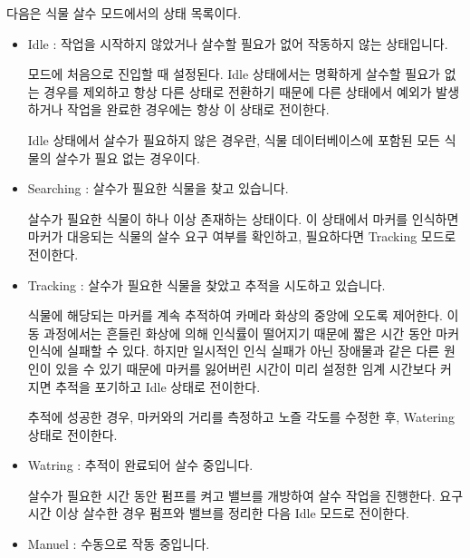 \documentclass[chapter,11pt,oneside,openany]{xoblivoir}
\begin{document}
다음은 식물 살수 모드에서의 상태 목록이다.
\begin{itemize}
\item Idle : 작업을 시작하지 않았거나 살수할 필요가 없어 작동하지 않는 상태입니다.

모드에 처음으로 진입할 때 설정된다. Idle 상태에서는 명확하게 살수할 필요가 없는 경우를 제외하고 항상
다른 상태로 전환하기 때문에 다른 상태에서 예외가 발생하거나 작업을 완료한 경우에는 항상 이 상태로 전이한다.

Idle 상태에서 살수가 필요하지 않은 경우란, 식물 데이터베이스에 포함된 모든 식물의 살수가 필요 없는 경우이다.

\item Searching : 살수가 필요한 식물을 찾고 있습니다.

살수가 필요한 식물이 하나 이상 존재하는 상태이다. 이 상태에서 마커를 인식하면 마커가 대응되는 식물의
살수 요구 여부를 확인하고, 필요하다면 Tracking 모드로 전이한다.

\item Tracking : 살수가 필요한 식물을 찾았고 추적을 시도하고 있습니다.

식물에 해당되는 마커를 계속 추적하여 카메라 화상의 중앙에 오도록 제어한다.
이동 과정에서는 흔들린 화상에 의해 인식률이 떨어지기 때문에 짧은 시간 동안 마커 인식에 실패할 수 있다.
하지만 일시적인 인식 실패가 아닌 장애물과 같은 다른 원인이 있을 수 있기 때문에
마커를 잃어버린 시간이 미리 설정한 임계 시간보다 커지면 추적을 포기하고 Idle 상태로 전이한다.

추적에 성공한 경우, 마커와의 거리를 측정하고 노즐 각도를 수정한 후, Watering 상태로 전이한다.

\item Watring : 추적이 완료되어 살수 중입니다.

살수가 필요한 시간 동안 펌프를 켜고 밸브를 개방하여 살수 작업을 진행한다.
요구 시간 이상 살수한 경우 펌프와 밸브를 정리한 다음 Idle 모드로 전이한다.

\item Manuel : 수동으로 작동 중입니다.
\end{itemize}
\end{document}
